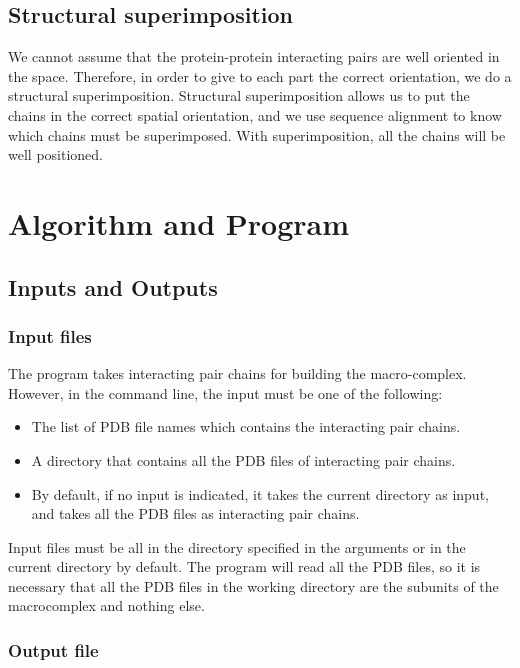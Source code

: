 \documentclass[a4paper,12pt]{report}
\begin{document}
\section{Structural superimposition}



We cannot assume that the protein-protein interacting pairs are well oriented in the space. Therefore, in order to give to each part the correct orientation, we do a structural superimposition. Structural superimposition allows us to put the chains in the correct spatial orientation, and we use sequence alignment to know which chains must be superimposed. With superimposition, all the chains will be well positioned. 



\chapter{Algorithm and Program}


\section{Inputs and Outputs}

\subsection{Input files}

The program takes interacting pair chains for building the macro-complex. However, in the command line, the input must be one of the following:

\begin{itemize}
 \item The list of PDB file names which contains the interacting pair chains.
 \item A directory that contains all the PDB files of interacting pair chains.
 \item By default, if no input is indicated, it takes the current directory as input, and takes all the PDB files as interacting pair chains.
\end{itemize}

\noindent
Input files must be all in the directory specified in the arguments or in the current directory by default. The program will read all the PDB files, so it is necessary that all the PDB files in the working directory are the subunits of the macrocomplex and nothing else.

\subsection{Output file}
\end{document}
